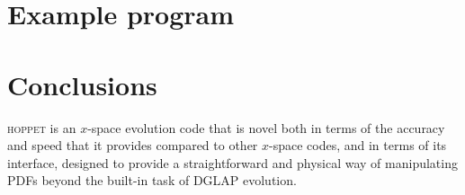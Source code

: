 \documentclass[12pt]{article}
\newcommand{\hoppet}{\textsc{hoppet}\xspace}
\begin{document}

\section{Example program}

\section{Conclusions}

\hoppet is an $x$-space evolution code that is novel both in terms of
the accuracy and speed that it provides compared to other $x$-space
codes, and in terms of its interface, designed to provide a
straightforward and physical way of manipulating PDFs beyond the
built-in task of DGLAP evolution.
\end{document}
